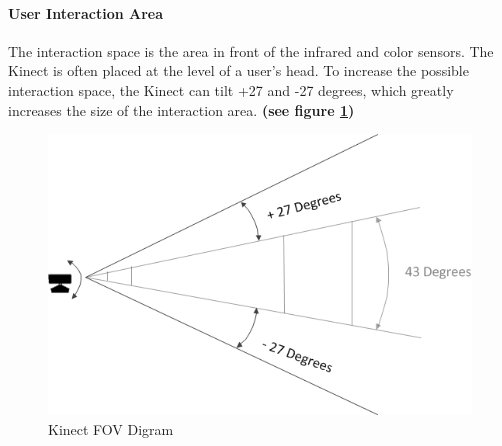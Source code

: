 \documentclass[a4paper,10pt]{article}
\begin{document}
\paragraph{User Interaction Area} 
The interaction space is the area in front of the infrared and color sensors. The Kinect is often placed at the level of a user's head.
To increase the possible interaction space, the Kinect can tilt +27 and -27 degrees, which greatly increases the size of the interaction area. \textbf{(see figure \ref{fig:kinectFov})}
\begin{figure}[H] %
	\centerline {\includegraphics[scale = 0.75]{kinectFov.png}}
	\caption{Kinect FOV Digram}
	\label{fig:kinectFov}
	\end{figure}
\pagebreak



	
\end{document}
